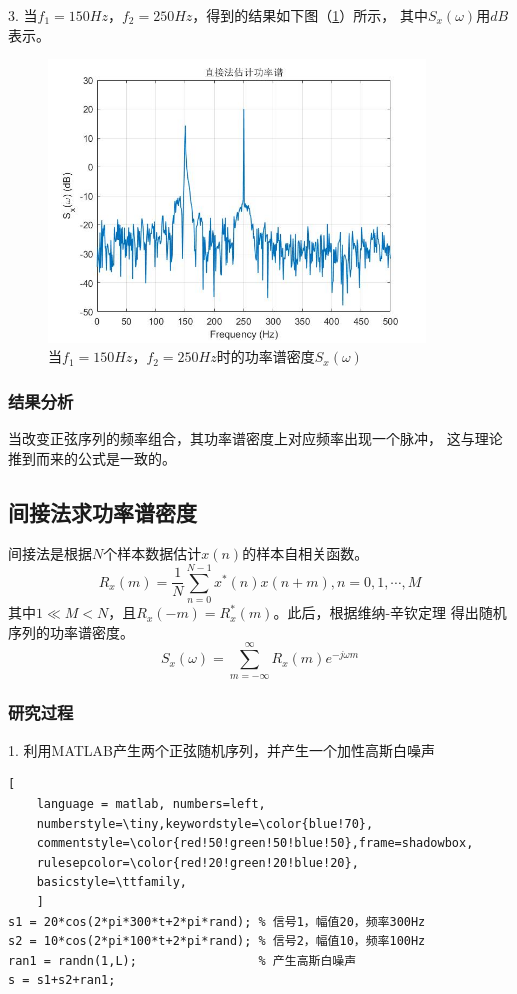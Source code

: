 \documentclass[UTF-8, a4paper, 12pt]{ctexart}
\begin{document}
3. 当$f_1=150Hz$，$ f_2=250Hz$，得到的结果如下图（\ref{p3}）所示，
其中$S_x(\omega)$用$dB$表示。
\begin{figure}[htbp]
    \centering
    \includegraphics[width=10cm]{figs/f63.jpg}
    \caption{当$f_1=150Hz$，$f_2=250Hz$时的功率谱密度$S_x(\omega)$}
    \label{p3}
\end{figure}
\subsubsection{结果分析}
当改变正弦序列的频率组合，其功率谱密度上对应频率出现一个脉冲，
这与理论推到而来的公式是一致的。

\subsection{间接法求功率谱密度}
间接法是根据$N$个样本数据估计$x(n)$的样本自相关函数。
\begin{equation}
    R_x(m)=\frac{1}{N}\sum^{N-1}_{n=0}x^\ast(n)x(n+m), n=0,1,\cdots,M
\end{equation}
其中$1\ll M< N $，且$R_x(-m)=R_x^\ast(m)$。此后，根据维纳-辛钦定理
得出随机序列的功率谱密度。
\begin{equation}
    S_x(\omega)=\sum_{m=-\infty}^{\infty}R_x(m)e^{-j\omega m}
\end{equation}

\subsubsection{研究过程}
1. 利用MATLAB产生两个正弦随机序列，并产生一个加性高斯白噪声
\begin{lstlisting}[
	language = matlab, numbers=left, 
	numberstyle=\tiny,keywordstyle=\color{blue!70},
	commentstyle=\color{red!50!green!50!blue!50},frame=shadowbox,
	rulesepcolor=\color{red!20!green!20!blue!20},
	basicstyle=\ttfamily,
	]
s1 = 20*cos(2*pi*300*t+2*pi*rand); % 信号1，幅值20，频率300Hz
s2 = 10*cos(2*pi*100*t+2*pi*rand); % 信号2，幅值10，频率100Hz
ran1 = randn(1,L);                 % 产生高斯白噪声
s = s1+s2+ran1;
\end{lstlisting}
\end{document}
